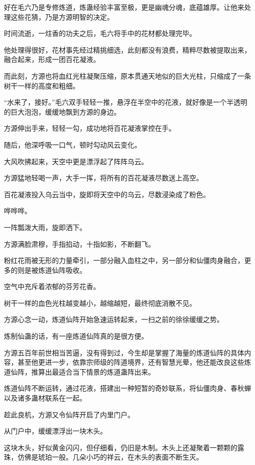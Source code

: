 \begin{this_body}
好在毛六乃是专修炼道，炼蛊经验丰富至极，更是幽魂分魂，底蕴雄厚。让他来处理这些花猜，乃是方源明智的决定。

时间流逝，一炷香的功夫之后，毛六将手中的花材都处理完毕。

他处理得很好，花材事先经过精挑细选，此刻都没有浪费，精粹尽数被提取出来，融合起来，形成一团百花凝液。

而此刻，方源也将血红光柱凝聚压缩，原本贯通天地似的巨大光柱，只缩成了一条树干一样的高度和粗细。

“水来了，接好。”毛六双手轻轻一推，悬浮在半空中的花液，就好像是一个半透明的巨大泡泡，缓缓地飘到方源的身边。

方源伸出手来，轻轻一勾，成功地将百花凝液掌控在手。

随后，他深呼吸一口气，顿时勾动风云变化。

大风吹拂起来，天空中更是漂浮起了阵阵乌云。

方源猛地轻喝一声，大手一挥，将所有的百花凝液尽数送上高空。

百花凝液投入乌云当中，旋即将天空中的乌云，尽数浸染成了粉色。

哗哗哗。

一阵瓢泼大雨，旋即洒下。

方源满脸肃穆，手指掐动，十指如影，不断翻飞。

粉红花雨被无形的力量牵引，一部分融入血柱之中，另一部分和仙僵肉身融合，更多的则是被炼道仙阵吸收。

空气中充斥着浓郁的芬芳花香。

树干一样的血色光柱越变越小，越缩越短，最终彻底消散不见。

方源心念一动，炼道仙阵开始急速运转起来，一扫之前的徐徐缓缓之势。

炼制仙蛊的话，有一座炼道仙阵真的是很方便。

方源五百年前世相当苦逼，没有得到过，今生却是掌握了海量的炼道仙阵的具体内容，甚至他更进一步，依靠宗师级的阵道境界，还有智慧光晕，他还能改良这些炼道仙阵，推算出最适合当下情景的炼道蛊阵出来。

炼道仙阵不断运转，通过花液，搭建出一种短暂的奇妙联系，将仙僵肉身、春秋蝉以及诸多蛊材联系在一起。

趁此良机，方源又令仙阵开启了内里门户。

从门户中，缓缓漂浮出一块木头。

这块木头，好似黄金闪闪，但仔细看，仍旧是木制。木头上还凝聚着一颗颗的露珠，仿佛是琥珀一般。几朵小巧的祥云，在木头的表面不断生灭。


\end{this_body}
